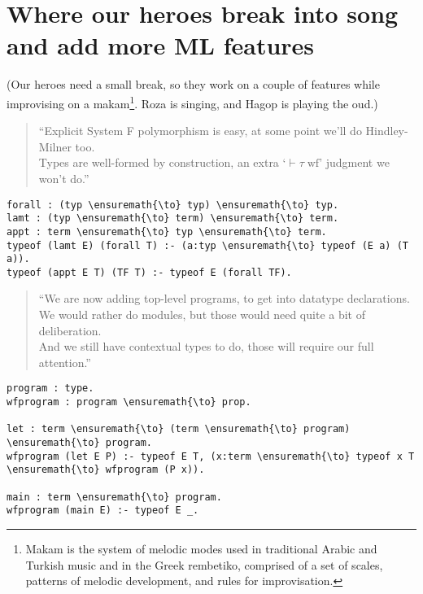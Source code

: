 \section{Where our heroes break into song and add more ML
features}\label{where-our-heroes-break-into-song-and-add-more-ml-features}

\begin{scenecomment}
(Our heroes need a small break, so they work on a couple of features while improvising on a makam\footnote{Makam is the system of melodic modes used in traditional Arabic and Turkish music and in the Greek rembetiko, comprised of a set of scales, patterns of melodic development, and rules for improvisation.}. Roza is singing, and Hagop is playing the oud.)
\end{scenecomment}

\begin{verse}
``Explicit System F polymorphism is easy, at some point we'll do Hindley-Milner too. \\
Types are well-formed by construction, an extra `$\vdash \tau \; \text{wf}$' judgment we won't do.''
\end{verse}

\begin{verbatim}
forall : (typ \ensuremath{\to} typ) \ensuremath{\to} typ.
lamt : (typ \ensuremath{\to} term) \ensuremath{\to} term.
appt : term \ensuremath{\to} typ \ensuremath{\to} term.
typeof (lamt E) (forall T) :- (a:typ \ensuremath{\to} typeof (E a) (T a)).
typeof (appt E T) (TF T) :- typeof E (forall TF).
\end{verbatim}

\begin{verse}
``We are now adding top-level programs, to get into datatype declarations. \\
We would rather do modules, but those would need quite a bit of deliberation. \\
And we still have contextual types to do, those will require our full attention.''
\end{verse}

\begin{verbatim}
program : type.
wfprogram : program \ensuremath{\to} prop.

let : term \ensuremath{\to} (term \ensuremath{\to} program) \ensuremath{\to} program.
wfprogram (let E P) :- typeof E T, (x:term \ensuremath{\to} typeof x T \ensuremath{\to} wfprogram (P x)).

main : term \ensuremath{\to} program.
wfprogram (main E) :- typeof E _.
\end{verbatim}

